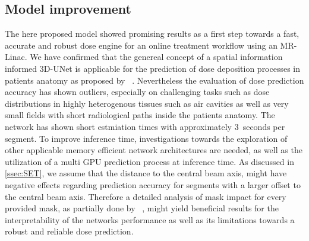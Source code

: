 \subsection{Model improvement}

The here proposed model showed promising results as a first step towards a fast, accurate and robust dose engine for an online treatment workflow using an MR-Linac. 
We have confirmed that the genereal concept of a spatial information informed 3D-UNet is applicable for the prediction of dose deposition processes in patients anatomy as proposed by \citeauthor{kontaxis_deepdose_2020}~\cite{kontaxis_deepdose_2020}.
Nevertheless the evaluation of dose prediction accuracy has shown outliers, especially on challenging tasks such as dose distributions in highly heterogenous tissues such as air cavities as well as very small fields with short radiological paths inside the patients anatomy.  
The network has shown short estmiation times with approximately 3~seconds per segment. 
To improve inference time, investigations towards the exploration of other applicable memory efficient network architectures are needed, as well as the utilization of a multi GPU prediction process at inference time.
As discussed in \autoref{ssec:SET}, we assume that the distance to the central beam axis, might have negative effects regarding prediction accuracy for segments with a larger offset to the central beam axis.
Therefore a detailed analysis of mask impact for every provided mask, as partially done by \citeauthor{kontaxis_deepdose_2020}~\cite{kontaxis_deepdose_2020}, might yield beneficial results for the interpretability of the networks performance as well as its limitations towards a robust and reliable dose prediction.\\

